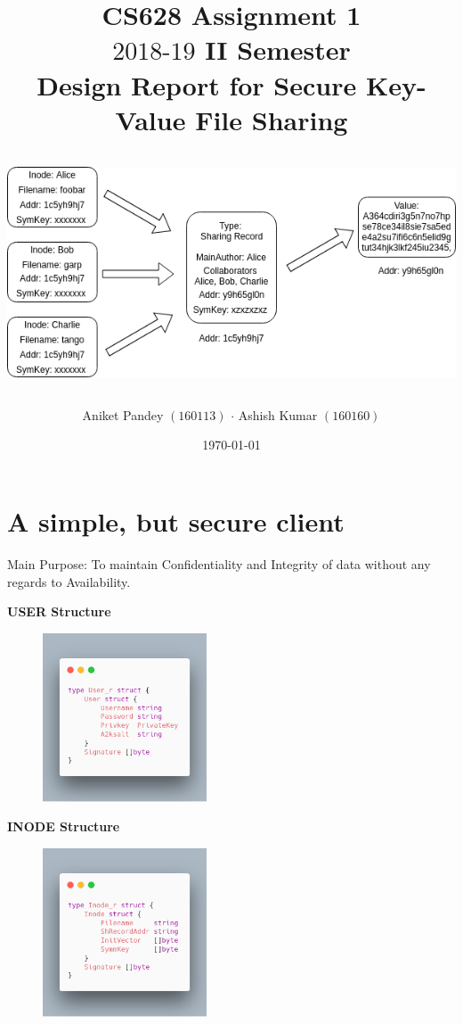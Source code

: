 \documentclass[a4paper, 12pt]{scrartcl}
\title{\vspace{40mm}CS628 Assignment 1 \\ $2018\text{-}19$  II Semester \\ \vspace{1cm} \textbf{Design Report for Secure Key-Value File Sharing}}
\subtitle{\includegraphics[width=\textwidth, height=7cm]{cs628.png}\vspace{20mm}}
\author{Aniket Pandey $(160113)$ $\cdot$ Ashish Kumar $(160160)$}
\date{\today}
\begin{document}
\clearpage\maketitle
\thispagestyle{empty}
\newpage


\section{A simple, but secure client}
Main Purpose: To maintain Confidentiality and Integrity of data without any regards to Availability.

\begin{multicols}{2}

\begin{center}
	\textbf{USER Structure}
\end{center}

\begin{center}
	\includegraphics[width=7cm, height=5cm]{user.png}
\end{center}

\columnbreak

\begin{center}
	\textbf{INODE Structure}
\end{center}

\begin{center}
	\includegraphics[width=7cm, height=5cm]{inode.png}
\end{center}

\end{multicols}
\end{document}
